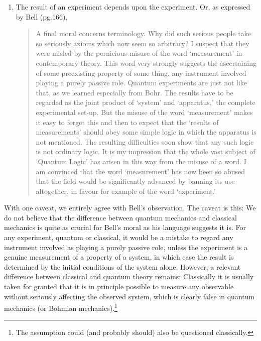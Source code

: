 \documentclass[12pt]{article}
\newcommand{\BM}{Bohmian mechanics}
\begin{document}
\begin{enumerate}
\item The result of an experiment depends upon the experiment.  Or, as
   expressed by Bell \cite{Bel87} (pg.166),
\begin{quotation}\setlength{\baselineskip}{12pt}\noindent
   A final moral concerns terminology. Why did such serious people take
   so seriously axioms which now seem so arbitrary? I suspect that they
   were misled by the pernicious misuse of the word `measurement' in
   contemporary theory. This word very strongly suggests the
   ascertaining of some preexisting property of some thing, any
   instrument involved playing a purely passive role. Quantum
   experiments are just not like that, as we learned especially {}from
   Bohr. The results have to be regarded as the joint product of
   `system' and `apparatus,' the complete experimental set-up. But the
   misuse of the word `measurement' makes it easy to forget this and
   then to expect that the `results of measurements' should obey some
   simple logic in which the apparatus is not mentioned. The resulting
   difficulties soon show that any such logic is not ordinary logic. It
   is my impression that the whole vast subject of `Quantum Logic' has
   arisen in this way {}from the misuse of a word. I am convinced that
   the word `measurement' has now been so abused that the field would
   be significantly advanced by banning its use altogether, in favour
   for example of the word `experiment.'
\end{quotation}
\end{enumerate}

With one caveat, we entirely agree with Bell's observation. The caveat
is this: We do not believe that the difference between quantum
mechanics and classical mechanics is quite as crucial for Bell's moral
as his language suggests it is.  For any experiment, quantum or
classical, it would be a mistake to regard any instrument involved as
playing a purely passive role, unless the experiment is a genuine
measurement of a property of a system, in which case the result is
determined by the initial conditions of the system alone. However, a
relevant difference between classical and quantum theory remains:
Classically it is usually taken for granted that it is in principle
possible to measure any observable without seriously affecting the
observed system, which is clearly false in quantum mechanics (or
\BM{}).\footnote{The assumption could (and probably should) also be
   questioned classically.}  \bigskip
\end{document}
